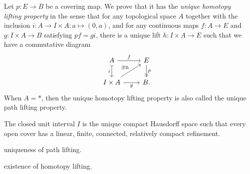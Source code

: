 \documentclass{../../large}
\begin{document}
\begin{prb}
Let $p:E\to B$ be a covering map.
We prove that it has the \emph{unique homotopy lifting property} in the sense that for any topological space $A$ together with the inclusion $i:A\to I\times A:a\mapsto(0,a)$, and for any continuous maps $f:A\to E$ and $g:I\times A\to B$ satisfying $pf=gi$, there is a unique lift $h:I\times A\to E$ such that we have a commutative diagram
\[\begin{tikzcd}
A\rar{f}\dar[>->,swap]{i}&E\dar[->>]{p}\\
I\times A\rar[swap]{g}\ar{ur}{\exists!h}&B.
\end{tikzcd}\]
When $A=*$, then the unique homotopy lifting property is also called the unique path lifting property.

\begin{parts}
\item The closed unit interval $I$ is the unique compact Hausdorff space such that every open cover has a linear, finite, connected, relatively compact refinement.
\item uniqueness of path lifting.
\item existence of homotopy lifting.
\end{parts}
\end{prb}
\end{document}
